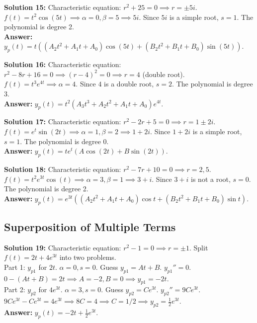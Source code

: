 \documentclass[11pt]{article}
\begin{document}
\textbf{Solution 15:} 
Characteristic equation: $r^2 + 25 = 0 \implies r = \pm 5i$. 
$f(t) = t^2 \cos(5t) \implies \alpha=0, \beta=5 \implies 5i$. Since $5i$ is a simple root, $s=1$. The polynomial is degree 2. \\
\textbf{Answer:} $y_p(t) = t \left( (A_2t^2 + A_1t + A_0)\cos(5t) + (B_2t^2 + B_1t + B_0)\sin(5t) \right)$.

\textbf{Solution 16:} 
Characteristic equation: $r^2 - 8r + 16 = 0 \implies (r-4)^2 = 0 \implies r = 4$ (double root). 
$f(t) = t^3 e^{4t} \implies \alpha=4$. Since $4$ is a double root, $s=2$. The polynomial is degree 3. \\
\textbf{Answer:} $y_p(t) = t^2 (A_3t^3 + A_2t^2 + A_1t + A_0)e^{4t}$.

\textbf{Solution 17:} 
Characteristic equation: $r^2 - 2r + 5 = 0 \implies r = 1 \pm 2i$. 
$f(t) = e^t \sin(2t) \implies \alpha=1, \beta=2 \implies 1+2i$. Since $1+2i$ is a simple root, $s=1$. The polynomial is degree 0. \\
\textbf{Answer:} $y_p(t) = t e^t (A\cos(2t) + B\sin(2t))$.

\textbf{Solution 18:} 
Characteristic equation: $r^2 - 7r + 10 = 0 \implies r = 2, 5$. 
$f(t) = t^2 e^{3t} \cos(t) \implies \alpha=3, \beta=1 \implies 3+i$. Since $3+i$ is not a root, $s=0$. The polynomial is degree 2. \\
\textbf{Answer:} $y_p(t) = e^{3t} \left( (A_2t^2 + A_1t + A_0)\cos t + (B_2t^2 + B_1t + B_0)\sin t \right)$.

\subsection*{Superposition of Multiple Terms}

\textbf{Solution 19:} 
Characteristic equation: $r^2 - 1 = 0 \implies r = \pm 1$. 
Split $f(t) = 2t + 4e^{3t}$ into two problems. \\
Part 1: $y_{p1}$ for $2t$. $\alpha=0, s=0$. Guess $y_{p1} = At + B$. $y_{p1}'' = 0$. \\
$0 - (At + B) = 2t \implies A = -2, B = 0 \implies y_{p1} = -2t$. \\
Part 2: $y_{p2}$ for $4e^{3t}$. $\alpha=3, s=0$. Guess $y_{p2} = Ce^{3t}$. $y_{p2}'' = 9Ce^{3t}$. \\
$9Ce^{3t} - Ce^{3t} = 4e^{3t} \implies 8C = 4 \implies C = 1/2 \implies y_{p2} = \frac{1}{2}e^{3t}$. \\
\textbf{Answer:} $y_p(t) = -2t + \frac{1}{2}e^{3t}$.
\end{document}
